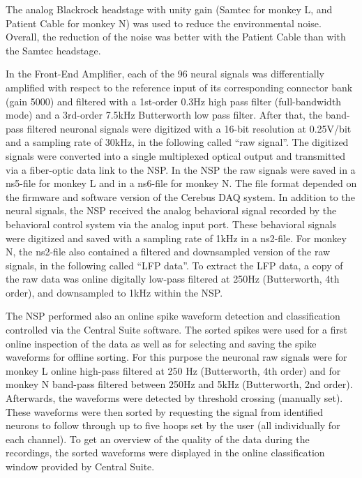 {The analog Blackrock headstage with unity gain (Samtec for monkey L, and Patient Cable for monkey N) was used to reduce the environmental noise. Overall, the reduction of the noise was better with the Patient Cable than with the Samtec headstage.

In the Front-End Amplifier, each of the 96 neural signals was differentially amplified with respect to the reference input of its corresponding connector bank (gain 5000) and filtered with a 1st-order 0.3Hz high pass filter (full-bandwidth mode) and a 3rd-order 7.5kHz Butterworth low pass filter. After that, the band-pass filtered neuronal signals were digitized with a 16-bit resolution at 0.25V/bit and a sampling rate of 30kHz, in the following called “raw signal”. The digitized signals were converted into a single multiplexed optical output and transmitted via a fiber-optic data link to the NSP. In the NSP the raw signals were saved in a ns5-file for monkey L and in a ns6-file for monkey N. The file format depended on the firmware and software version of the Cerebus DAQ system. In addition to the neural signals, the NSP received the analog behavioral signal recorded by the behavioral control system via the analog input port. These behavioral signals were digitized and saved with a sampling rate of 1kHz in a ns2-file. For monkey N, the ns2-file also contained a filtered and downsampled version of the raw signals, in the following called “LFP data”. To extract the LFP data, a copy of the raw data was online digitally low-pass filtered at 250Hz (Butterworth, 4th order), and downsampled to 1kHz within the NSP.

The NSP performed also an online spike waveform detection and classification controlled via the Central Suite software. The sorted spikes were used for a first online inspection of the data as well as for selecting and saving the spike waveforms for offline sorting. For this purpose the neuronal raw signals were for monkey L online high-pass filtered at 250 Hz (Butterworth, 4th order) and for monkey N band-pass filtered between 250Hz and 5kHz (Butterworth, 2nd order). Afterwards, the waveforms were detected by threshold crossing (manually set). These waveforms were then sorted by requesting the signal from identified neurons to follow through up to five hoops set by the user (all individually for each channel). To get an overview of the quality of the data during the recordings, the sorted waveforms were displayed in the online classification window provided by Central Suite.

}
